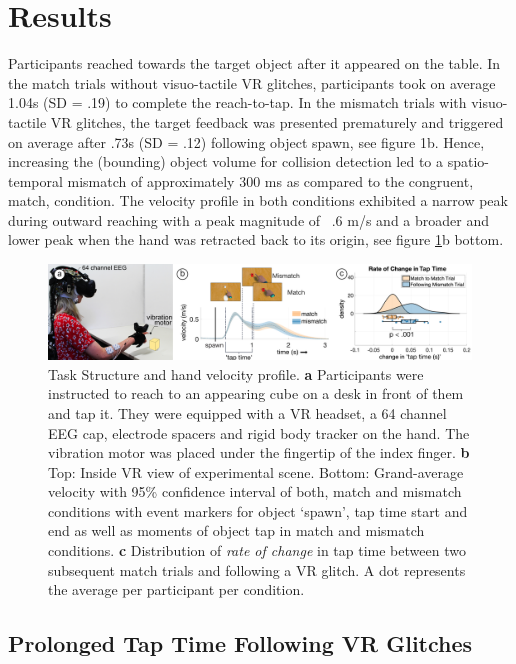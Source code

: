 
\section{Results}

Participants reached towards the target object after it appeared on the table. In the match trials without visuo-tactile VR glitches, participants took on average 1.04s (SD = .19) to complete the reach-to-tap. In the mismatch trials with visuo-tactile VR glitches, the target feedback was presented prematurely and triggered on average after .73s (SD = .12) following object spawn, see figure 1b. Hence, increasing the (bounding) object volume for collision detection led to a spatio-temporal mismatch of approximately 300 ms as compared to the congruent, match, condition. The velocity profile in both conditions exhibited a narrow peak during outward reaching with a peak magnitude of ~.6 m/s and a broader and lower peak when the hand was retracted back to its origin, see figure \ref{setup_and_behavior}b bottom.

\begin{figure}[!h]
  \includegraphics[width=\textwidth]{figures/task_behavior.jpg}
  \caption{Task Structure and hand velocity profile. \textbf{a} Participants were instructed to reach to an appearing cube on a desk in front of them and tap it. They were equipped with a VR headset, a 64 channel EEG cap, electrode spacers and rigid body tracker on the hand. The vibration motor was placed under the fingertip of the index finger. \textbf{b} Top: Inside VR view of experimental scene. Bottom: Grand-average velocity with 95\% confidence interval of both, match and mismatch conditions with event markers for object `spawn', tap time start and end as well as moments of object tap in match and mismatch conditions. \textbf{c} Distribution of \textit{rate of change} in tap time between two subsequent match trials and following a VR glitch. A dot represents the average per participant per condition.}
  \label{setup_and_behavior}
\end{figure}

\subsection{Prolonged Tap Time Following VR Glitches}

